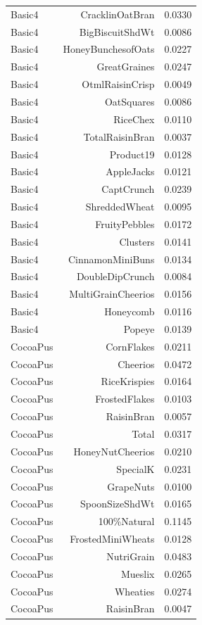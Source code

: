 \begin{longtable}{@{}lrr@{}}
Basic4 & CracklinOatBran & 0.0330 \\
Basic4 & BigBiscuitShdWt & 0.0086 \\
Basic4 & HoneyBunchesofOats & 0.0227 \\
Basic4 & GreatGraines & 0.0247 \\
Basic4 & OtmlRaisinCrisp & 0.0049 \\
Basic4 & OatSquares & 0.0086 \\
Basic4 & RiceChex & 0.0110 \\
Basic4 & TotalRaisinBran & 0.0037 \\
Basic4 & Product19 & 0.0128 \\
Basic4 & AppleJacks & 0.0121 \\
Basic4 & CaptCrunch & 0.0239 \\
Basic4 & ShreddedWheat & 0.0095 \\
Basic4 & FruityPebbles & 0.0172 \\
Basic4 & Clusters & 0.0141 \\
Basic4 & CinnamonMiniBuns & 0.0134 \\
Basic4 & DoubleDipCrunch & 0.0084 \\
Basic4 & MultiGrainCheerios & 0.0156 \\
Basic4 & Honeycomb & 0.0116 \\
Basic4 & Popeye & 0.0139 \\
CocoaPus & CornFlakes & 0.0211 \\
CocoaPus & Cheerios & 0.0472 \\
CocoaPus & RiceKrispies & 0.0164 \\
CocoaPus & FrostedFlakes & 0.0103 \\
CocoaPus & RaisinBran & 0.0057 \\
CocoaPus & Total & 0.0317 \\
CocoaPus & HoneyNutCheerios & 0.0210 \\
CocoaPus & SpecialK & 0.0231 \\
CocoaPus & GrapeNuts & 0.0100 \\
CocoaPus & SpoonSizeShdWt & 0.0165 \\
CocoaPus & 100\%Natural & 0.1145 \\
CocoaPus & FrostedMiniWheats & 0.0128 \\
CocoaPus & NutriGrain & 0.0483 \\
CocoaPus & Mueslix & 0.0265 \\
CocoaPus & Wheaties & 0.0274 \\
CocoaPus & RaisinBran & 0.0047 \\

\end{longtable}
